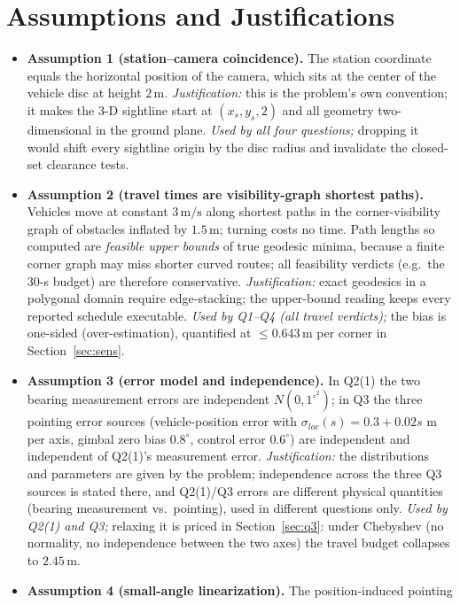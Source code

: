 \section{Assumptions and Justifications}

\begin{itemize}\setlength{\itemsep}{2pt}
\item \textbf{Assumption 1 (station--camera coincidence).} The station coordinate equals
the horizontal position of the camera, which sits at the center of the vehicle disc at
height $2\,\mathrm{m}$. \emph{Justification:} this is the problem's own convention; it
makes the 3-D sightline start at $(x_s,y_s,2)$ and all geometry two-dimensional in the
ground plane. \emph{Used by all four questions;} dropping it would shift every
sightline origin by the disc radius and invalidate the closed-set clearance tests.
\item \textbf{Assumption 2 (travel times are visibility-graph shortest paths).} Vehicles
move at constant $3\,\mathrm{m}/\mathrm{s}$ along shortest paths in the corner-visibility
graph of obstacles inflated by $1.5\,\mathrm{m}$; turning costs no time. Path lengths so
computed are \emph{feasible upper bounds} of true geodesic minima, because a finite corner
graph may miss shorter curved routes; all feasibility verdicts (e.g.\ the 30-s budget)
are therefore conservative. \emph{Justification:} exact geodesics in a polygonal domain
require edge-stacking; the upper-bound reading keeps every reported schedule executable.
\emph{Used by Q1--Q4 (all travel verdicts);} the bias is one-sided (over-estimation),
quantified at $\le0.643\,\mathrm{m}$ per corner in Section~\ref{sec:sens}.
\item \textbf{Assumption 3 (error model and independence).} In Q2(1) the two bearing
measurement errors are independent $N(0,1^{\circ^2})$; in Q3 the three pointing error
sources (vehicle-position error with $\sigma_{loc}(s)=0.3+0.02s$ m per axis, gimbal zero
bias $0.8^\circ$, control error $0.6^\circ$) are independent and independent of Q2(1)'s
measurement error. \emph{Justification:} the distributions and parameters are given by
the problem; independence across the three Q3 sources is stated there, and Q2(1)/Q3
errors are different physical quantities (bearing measurement vs.\ pointing), used in
different questions only. \emph{Used by Q2(1) and Q3;} relaxing it is priced in
Section~\ref{sec:q3}: under Chebyshev (no normality, no independence between the two
axes) the travel budget collapses to $2.45\,\mathrm{m}$.
\item \textbf{Assumption 4 (small-angle linearization).} The position-induced pointing

\end{itemize}
